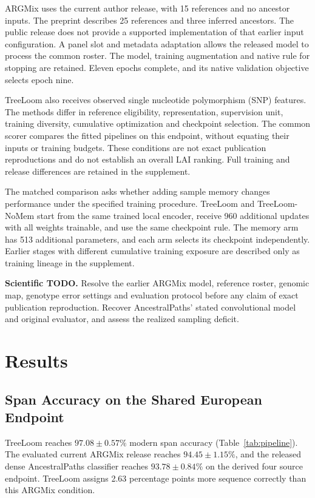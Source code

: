 \documentclass[letterpaper]{article}
\newcommand{\todo}[1]{\par\noindent\textbf{Scientific TODO.} #1\par}
\begin{document}
ARGMix uses the current author release, with 15 references and no ancestor inputs. The preprint describes 25 references and three inferred ancestors. The public release does not provide a supported implementation of that earlier input configuration. A panel slot and metadata adaptation allows the released model to process the common roster. The model, training augmentation and native rule for stopping are retained. Eleven epochs complete, and its native validation objective selects epoch nine.

TreeLoom also receives observed single nucleotide polymorphism (SNP) features. The methods differ in reference eligibility, representation, supervision unit, training diversity, cumulative optimization and checkpoint selection. The common scorer compares the fitted pipelines on this endpoint, without equating their inputs or training budgets. These conditions are not exact publication reproductions and do not establish an overall LAI ranking. Full training and release differences are retained in the supplement.

The matched comparison asks whether adding sample memory changes performance under the specified training procedure. TreeLoom and TreeLoom-NoMem start from the same trained local encoder, receive 960 additional updates with all weights trainable, and use the same checkpoint rule. The memory arm has 513 additional parameters, and each arm selects its checkpoint independently. Earlier stages with different cumulative training exposure are described only as training lineage in the supplement.

\todo{Resolve the earlier ARGMix model, reference roster, genomic map, genotype error settings and evaluation protocol before any claim of exact publication reproduction. Recover AncestralPaths' stated convolutional model and original evaluator, and assess the realized sampling deficit.}

\section{Results}
\subsection{Span Accuracy on the Shared European Endpoint}
TreeLoom reaches $97.08\pm0.57\%$ modern span accuracy (Table~\ref{tab:pipeline}). The evaluated current ARGMix release reaches $94.45\pm1.15\%$, and the released dense AncestralPaths classifier reaches $93.78\pm0.84\%$ on the derived four source endpoint. TreeLoom assigns 2.63 percentage points more sequence correctly than this ARGMix condition.
\end{document}
